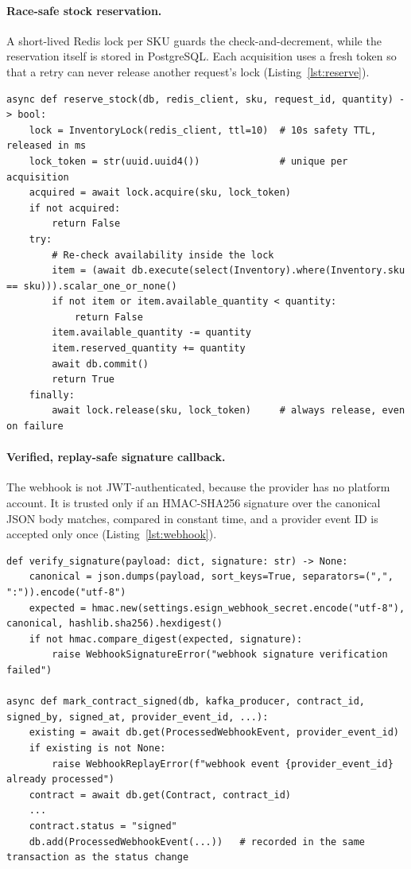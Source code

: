 \paragraph{Race-safe stock reservation.} A short-lived Redis lock per SKU guards the check-and-decrement, while the reservation itself is stored in PostgreSQL. Each acquisition uses a fresh token so that a retry can never release another request's lock (Listing~\ref{lst:reserve}).

\begin{lstlisting}[caption={[Stock reservation under a Redis lock]Stock reservation under a Redis lock (approval-inventory-agent, \texttt{inventory\_service.py})}, label={lst:reserve}]
async def reserve_stock(db, redis_client, sku, request_id, quantity) -> bool:
    lock = InventoryLock(redis_client, ttl=10)  # 10s safety TTL, released in ms
    lock_token = str(uuid.uuid4())              # unique per acquisition
    acquired = await lock.acquire(sku, lock_token)
    if not acquired:
        return False
    try:
        # Re-check availability inside the lock
        item = (await db.execute(select(Inventory).where(Inventory.sku == sku))).scalar_one_or_none()
        if not item or item.available_quantity < quantity:
            return False
        item.available_quantity -= quantity
        item.reserved_quantity += quantity
        await db.commit()
        return True
    finally:
        await lock.release(sku, lock_token)     # always release, even on failure
\end{lstlisting}

\paragraph{Verified, replay-safe signature callback.} The webhook is not JWT-authenticated, because the provider has no platform account. It is trusted only if an HMAC-SHA256 signature over the canonical JSON body matches, compared in constant time, and a provider event ID is accepted only once (Listing~\ref{lst:webhook}).

\begin{lstlisting}[caption={[HMAC verification and replay protection]HMAC verification and replay protection (contract-risk-agent, \texttt{webhook\_service.py})}, label={lst:webhook}]
def verify_signature(payload: dict, signature: str) -> None:
    canonical = json.dumps(payload, sort_keys=True, separators=(",", ":")).encode("utf-8")
    expected = hmac.new(settings.esign_webhook_secret.encode("utf-8"), canonical, hashlib.sha256).hexdigest()
    if not hmac.compare_digest(expected, signature):
        raise WebhookSignatureError("webhook signature verification failed")

async def mark_contract_signed(db, kafka_producer, contract_id, signed_by, signed_at, provider_event_id, ...):
    existing = await db.get(ProcessedWebhookEvent, provider_event_id)
    if existing is not None:
        raise WebhookReplayError(f"webhook event {provider_event_id} already processed")
    contract = await db.get(Contract, contract_id)
    ...
    contract.status = "signed"
    db.add(ProcessedWebhookEvent(...))   # recorded in the same transaction as the status change
\end{lstlisting}

